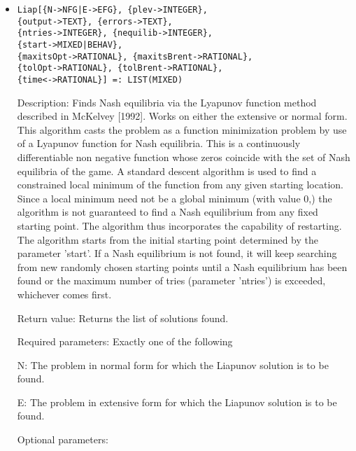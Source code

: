 \begin{itemize}
\item
\protect \large \begin{verbatim}
Liap[{N->NFG|E->EFG}, {plev->INTEGER},
{output->TEXT}, {errors->TEXT},
{ntries->INTEGER}, {nequilib->INTEGER},
{start->MIXED|BEHAV},
{maxitsOpt->RATIONAL}, {maxitsBrent->RATIONAL}, 
{tolOpt->RATIONAL}, {tolBrent->RATIONAL},
{time<->RATIONAL}] =: LIST(MIXED)
\end{verbatim}\normalsize

\bd
\item
[Description:] Finds Nash equilibria via the Lyapunov function method
described in McKelvey [1992].  Works on either the extensive or normal
form.  This algorithm casts the problem as a function minimization
problem by use of a Lyapunov function for Nash equilibria.  This is a
continuously differentiable non negative function whose zeros coincide
with the set of Nash equilibria of the game.  A standard descent
algorithm is used to find a constrained local minimum of the function
from any given starting location.  Since a local minimum need not be a
global minimum (with value 0,) the algorithm is not guaranteed to find
a Nash equilibrium from any fixed starting point.  The algorithm thus
incorporates the capability of restarting.  The algorithm starts from
the initial starting point determined by the parameter 'start'.  If a
Nash equilibrium is not found, it will keep searching from new
randomly chosen starting points until a Nash equilibrium has been
found or the maximum number of tries (parameter 'ntries') is exceeded,
whichever comes first.
\item
[Return value:] Returns the list of solutions found.
\item
[Required parameters:] Exactly one of the following \hfil\null

\bd
\item
[N:] The problem in normal form for which the Liapunov solution is to
be found.
\item
[E:] The problem in extensive form for which the Liapunov solution is
to be found.
\ed

\item
[Optional parameters:]\hfil\null


\end{itemize}
